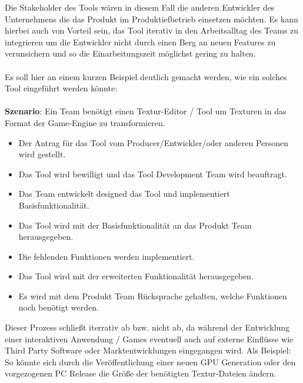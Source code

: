 \documentclass[pagesize, paper=a4, fontsize=12pt,titlepage=true, headings=small, headnosepline, abstractoff, liststotoc, nochapterprefix, plainheadsepline, twoside]{scrreprt}
\begin{document}
Die Stakeholder des Tools wären in diesem Fall die anderen Entwickler des Unternehmens die das Produkt im Produktiefbetrieb einsetzen möchten. Es kann hierbei auch von Vorteil sein, das Tool iterativ in den Arbeitsalltag des Teams zu integrieren um die Entwickler nicht durch einen Berg an neuen Features zu verunsichern und so die Einarbeitungszeit möglichst gering zu halten.
\\
\\
Es soll hier an einem kurzen Beispiel deutlich gemacht werden, wie ein solches Tool eingeführt werden könnte:
\\
\\
\textbf{Szenario}: Ein Team benötigt einen Textur-Editor / Tool um Texturen in das Format der Game-Engine zu transformieren.
\begin{itemize}
\item Der Antrag für das Tool vom Producer/Entwickler/oder anderen Personen wird gestellt.
\item Das Tool wird bewilligt und das Tool Development Team wird beauftragt.
\item Das Team entwickelt designed das Tool und implementiert Basisfunktionalität.
\item Das Tool wird mit der Basisfunktionalität an das Produkt Team herausgegeben.
\item Die fehlenden Funktionen werden implementiert.
\item Das Tool wird mit der erweiterten Funktionalität herausgegeben.
\item Es wird mit dem Produkt Team Rücksprache gehalten, welche Funktionen noch benötigt werden.
\end{itemize}
Dieser Prozess schließt iterrativ ab bzw. nicht ab, da während der Entwicklung einer interaktiven Anwendung / Games eventuell auch auf externe Einflüsse wie Third Party Software oder Marktentwicklungen eingegangen wird. Als Beispiel: So könnte sich durch die Veröffentlichung einer neuen GPU Generation oder den vorgezogenen PC Release die Größe der benötigten Textur-Dateien ändern.
\end{document}
